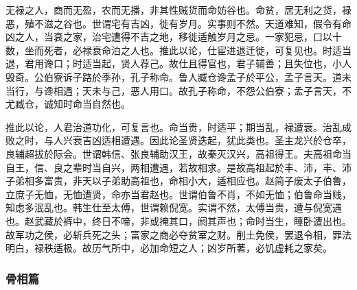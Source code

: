 \documentclass[]{article}
\begin{document}
无禄之人，商而无盈，农而无播，非其性贼货而命妨谷也。命贫，居无利之货，禄恶，殖不滋之谷也。世谓宅有吉凶，徙有岁月。实事则不然。天道难知，假令有命凶之人，当衰之家，治宅遭得不吉之地，移徙适触岁月之忌。一家犯忌，口以十数，坐而死者，必禄衰命泊之人也。推此以论，仕宦进退迁徙，可复见也。时适当退，君用谗口；时适当起，贤人荐己。故仕且得官也，君子辅善；且失位也，小人毁奇。公伯寮诉子路於季孙，孔子称命。鲁人臧仓谗孟子於平公，孟子言天。道未当行，与谗相遇；天未与己，恶人用口。故孔子称命，不怨公伯寮；孟子言天，不尤臧仓，诚知时命当自然也。

推此以论，人君治道功化，可复言也。命当贵，时适平；期当乱，禄遭衰。治乱成败之时，与人兴衰吉凶适相遭遇。因此论圣贤迭起，犹此类也。圣主龙兴於仓卒，良辅超拔於际会。世谓韩信、张良辅助汉王，故秦灭汉兴，高祖得王。夫高祖命当自王，信、良之辈时当自兴，两相遭遇，若故相求。是故高祖起於丰、沛，丰、沛子弟相多富贵，非天以子弟助高祖也，命相小大，适相应也。赵简子废太子伯鲁，立庶子无恤，无恤遭贤，命亦当君赵也。世谓伯鲁不肖，不如无恤；伯鲁命当贱，知虑多泯乱也。韩生仕至太傅，世谓赖倪宽。实谓不然，太傅当贵，遭与倪宽遇也。赵武藏於裤中，终日不啼，非或掩其口，阏其声也；命时当生，睡卧遭出也。故军功之侯，必斩兵死之头；富家之商必夺贫室之财。削土免侯，罢退令相，罪法明白，禄秩适极。故历气所中，必加命短之人；凶岁所著，必饥虚耗之家矣。

\hypertarget{header-n107}{%
\subsubsection{骨相篇}\label{header-n107}}
\end{document}
